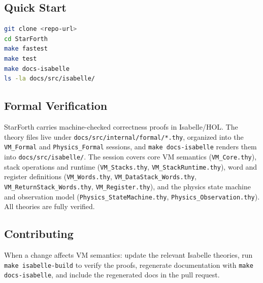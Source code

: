 \subsection{Quick Start}

\begin{lstlisting}[language=bash]
git clone <repo-url>
cd StarForth
make fastest
make test
make docs-isabelle
ls -la docs/src/isabelle/
\end{lstlisting}

\subsection{Formal Verification}

StarForth carries machine-checked correctness proofs in Isabelle/HOL. The
theory files live under \texttt{docs/src/internal/formal/*.thy}, organized into
the \texttt{VM\_Formal} and \texttt{Physics\_Formal} sessions, and
\texttt{make docs-isabelle} renders them into \texttt{docs/src/isabelle/}. The
session covers core VM semantics (\texttt{VM\_Core.thy}), stack operations and
runtime (\texttt{VM\_Stacks.thy}, \texttt{VM\_StackRuntime.thy}), word and
register definitions (\texttt{VM\_Words.thy},
\texttt{VM\_DataStack\_Words.thy}, \texttt{VM\_ReturnStack\_Words.thy},
\texttt{VM\_Register.thy}), and the physics state machine and observation model
(\texttt{Physics\_StateMachine.thy}, \texttt{Physics\_Observation.thy}). All
theories are fully verified.


\subsection{Contributing}

When a change affects VM semantics: update the relevant Isabelle theories, run
\texttt{make isabelle-build} to verify the proofs, regenerate documentation
with \texttt{make docs-isabelle}, and include the regenerated docs in the pull
request.
